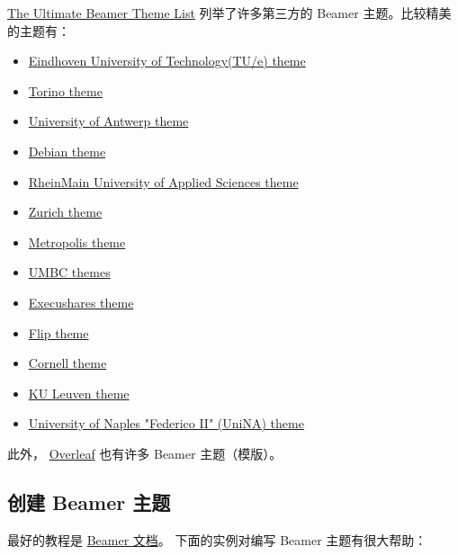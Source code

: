 \begin{column}{0.5\textwidth}
\href{https://github.com/martinbjeldbak/ultimate-beamer-theme-list}{The Ultimate Beamer Theme List} 列举了许多第三方的 Beamer 主题。比较精美的主题有：  

\begin{itemize}
  \item \href{http://www.win.tue.nl/latex/windows.html}{Eindhoven University of Technology(TU/e) theme}
  \item \href{https://github.com/barisione/beamer-torino}{Torino theme}
  \item \href{https://github.com/nschloe/ua-beamer}{University of Antwerp theme}
  \item \href{https://github.com/uwabami/beamerthemeKansaiDebianMeeting}{Debian theme}
  \item \href{https://github.com/benjamin-weiss/hsrmbeamertheme}{RheinMain University of Applied Sciences theme}
  \item \href{https://github.com/ppletscher/beamerthemezurich}{Zurich theme}
  \item \href{https://github.com/matze/mtheme}{Metropolis theme}
  \item \href{http://userpages.umbc.edu/~rostamia/beamer/quickstart-Z-H-8.html#node_sec_8}{UMBC themes}
  \item \href{https://github.com/FuzzyWuzzie/Beamer-Theme-Execushares}{Execushares theme}
  \item \href{https://www.physics.uci.edu/~tanedo/docs.html}{Flip theme}
  \item \href{https://pi.math.cornell.edu/~gomez/Research.html}{Cornell theme}
  \item \href{https://github.com/naiaden/presentations/tree/master/Leuven-9monthsprogress}{KU Leuven theme}
  \item \href{https://github.com/luistar/unina-beamer}{University of Naples "Federico II" (UniNA) theme}
\end{itemize}

此外， \href{https://www.overleaf.com/latex/templates/tagged/presentation}{Overleaf} 也有许多 Beamer 主题（模版）。

\subsection{创建 Beamer 主题}

最好的教程是 \href{https://tug.ctan.org/macros/latex/contrib/beamer/doc/beameruserguide.pdf}{Beamer 文档}。
下面的实例对编写 Beamer 主题有很大帮助：


\end{column}
